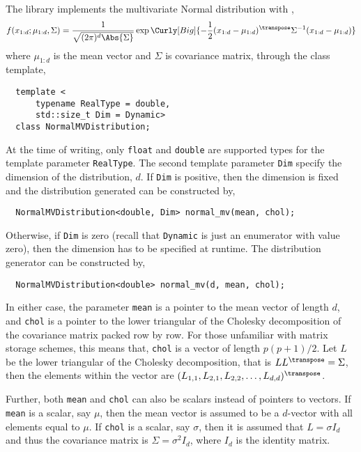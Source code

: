 The library implements the multivariate Normal distribution with \pdf,
\begin{equation*}
  f(x_{1:d};\mu_{1:d},\Sigma) = \frac{1}{\sqrt{(2\pi)^d\Abs{\Sigma}}}
  \exp\Curly[Big]{-\frac{1}{2}
    (x_{1:d} - \mu_{1:d})^{\transpose}\Sigma^{-1}(x_{1:d} - \mu_{1:d})}
\end{equation*}
where $\mu_{1:d}$ is the mean vector and $\Sigma$ is covariance matrix, through
the class template,
\begin{Verbatim}
  template <
      typename RealType = double,
      std::size_t Dim = Dynamic>
  class NormalMVDistribution;
\end{Verbatim}
At the time of writing, only \verb|float| and \verb|double| are supported types
for the template parameter \verb|RealType|. The second template parameter
\verb|Dim| specify the dimension of the distribution, $d$. If \verb|Dim| is
positive, then the dimension is fixed and the distribution generated can be
constructed by,
\begin{Verbatim}
  NormalMVDistribution<double, Dim> normal_mv(mean, chol);
\end{Verbatim}
Otherwise, if \verb|Dim| is zero (recall that \verb|Dynamic| is just an
enumerator with value zero), then the dimension has to be specified at runtime.
The distribution generator can be constructed by,
\begin{Verbatim}
  NormalMVDistribution<double> normal_mv(d, mean, chol);
\end{Verbatim}
In either case, the parameter \verb|mean| is a pointer to the mean vector of
length $d$, and \verb|chol| is a pointer to the lower triangular of the
Cholesky decomposition of the covariance matrix packed row by row. For those
unfamiliar with matrix storage schemes, this means that, \verb|chol| is a
vector of length $p(p+1)/2$. Let $L$ be the lower triangular of the Cholesky
decomposition, that is $LL^{\transpose} = \Sigma$, then the elements within the
vector are $(L_{1,1},L_{2,1},L_{2,2},\dots,L_{d,d})^{\transpose}$.

Further, both \verb|mean| and \verb|chol| can also be scalars instead of
pointers to vectors. If \verb|mean| is a scalar, say $\mu$, then the mean
vector is assumed to be a $d$-vector with all elements equal to $\mu$. If
\verb|chol| is a scalar, say $\sigma$, then it is assumed that $L = \sigma I_d$
and thus the covariance matrix is $\Sigma = \sigma^2 I_d$, where $I_d$ is the
identity matrix.

